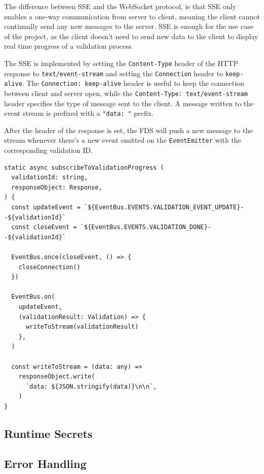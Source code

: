     The difference between SSE and the WebSocket protocol, is that SSE only enables a one-way communication from server to client, meaning the client cannot continually send any new messages to the server. SSE is enough for the use case of the project, as the client doesn't need to send new data to the client to display real time progress of a validation process.

    The SSE is implemented by setting the \verb;Content-Type; header of the HTTP response to \verb;text/event-stream; and setting the \verb;Connection; header to \verb;keep-alive;. The \verb;Connection: keep-alive; header is useful to keep the connection between client and server open, while the \verb;Content-Type: text/event-stream; header specifies the type of message sent to the client. A message written to the event stream is prefixed with a \verb;"data: "; prefix. 

    After the header of the response is set, the FDS will push a new message to the stream whenever there's a new event emitted on the \verb;EventEmitter; with the corresponding validation ID. 

    \begin{lstlisting}[style=es6, caption={Writing to SSE stream when certain events are published (TypeScript)}]
static async subscribeToValidationProgress (
  validationId: string,
  responseObject: Response,
) {
  const updateEvent = `${EventBus.EVENTS.VALIDATION_EVENT_UPDATE}--${validationId}`
  const closeEvent = `${EventBus.EVENTS.VALIDATION_DONE}--${validationId}`

  EventBus.once(closeEvent, () => {
    closeConnection()
  })

  EventBus.on(
    updateEvent,
    (validationResult: Validation) => {
      writeToStream(validationResult)
    },
  )

  const writeToStream = (data: any) =>
    responseObject.write(
      `data: ${JSON.stringify(data)}\n\n`,
    )
}
    \end{lstlisting}

  \subsection{Runtime Secrets}
    \label{sub:secrets} 

  \subsection{Error Handling}

